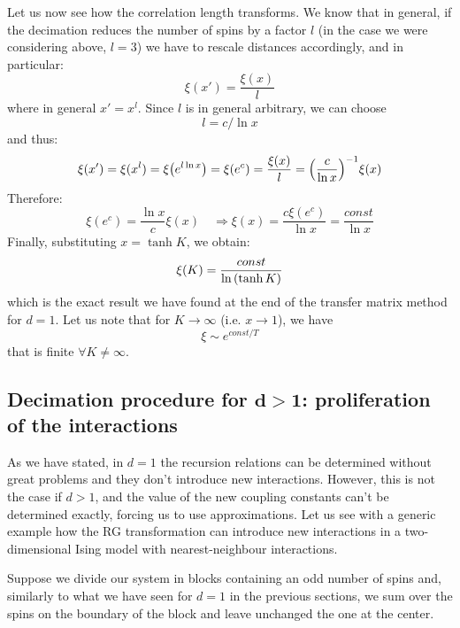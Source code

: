 \documentclass[../../Main/Main.tex]{subfiles}
\begin{document}
Let us now see how the correlation length transforms. We know that in general, if the decimation reduces the number of spins by a factor \( l \) (in the case we were considering above, \( l=3 \)) we have to rescale distances accordingly, and in particular:
\begin{equation*}
  \xi (x') = \frac{\xi (x)}{l}
\end{equation*}
where in general \(  x' = x^l \).
Since \( l \) is in general arbitrary, we can choose
\begin{equation*}
  l = c / \ln{x}
\end{equation*}
and thus:
\begin{equation*}
  \xi (x') = \xi (x^l) = \xi  \qty(e ^{l \ln{x} }) = \xi (e^c) = \frac{\xi (x)}{l}
  = \qty(\frac{c}{\ln{x} })^{-1} \xi (x)
\end{equation*}
Therefore:
\begin{equation*}
  \xi (e^c) = \frac{\ln{x} }{c} \xi (x) \quad \Rightarrow \xi (x) = \frac{c \xi (e^c)}{\ln{x} } = \frac{const}{\ln{x} }
\end{equation*}
Finally, substituting \( x= \tanh K \), we obtain:
\begin{equation}
  \xi (K) = \frac{const}{\ln{\qty(\tanh K) } }
\end{equation}
which is the exact result we have found at the end of the transfer matrix method for \( d=1 \).
Let us note that for \( K \rightarrow \infty  \) (i.e. \( x \rightarrow 1 \)), we have
\begin{equation*}
  \xi \sim e^{const/T}
\end{equation*}
that is finite \( \forall K \neq \infty  \).




\subsection{Decimation procedure for \( \pmb{d>1} \): proliferation of the interactions}
As we have stated, in \( d=1 \) the recursion relations can be determined without great problems and they don't introduce new interactions. However, this is not the case if \( d>1 \), and the value of the new coupling constants can't be determined exactly, forcing us to use approximations. Let us see with a generic example how the RG transformation can introduce new interactions in a two-dimensional Ising model with nearest-neighbour interactions.

Suppose we divide our system in blocks containing an odd number of spins and, similarly to what we have seen for \( d=1 \) in the previous sections, we sum over the spins on the boundary of the block and leave unchanged the one at the center.
\end{document}
